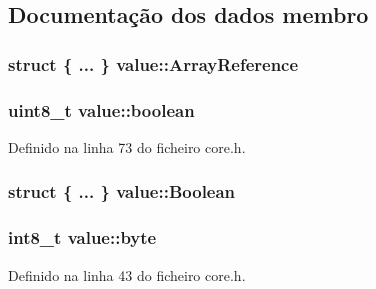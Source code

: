 \subsection{Documentação dos dados membro}
\hypertarget{structvalue_a09d361f523397d57aa1589c63fddb429}{
\subsubsection[{Array\-Reference}]{\setlength{\rightskip}{0pt plus 5cm}struct \{ ... \}   value\-::\-Array\-Reference}}\label{structvalue_a09d361f523397d57aa1589c63fddb429}
\hypertarget{structvalue_accc539dfc5234b1ff83f084dfeedab4e}{
\subsubsection[{boolean}]{\setlength{\rightskip}{0pt plus 5cm}uint8\-\_\-t value\-::boolean}}\label{structvalue_accc539dfc5234b1ff83f084dfeedab4e}


Definido na linha 73 do ficheiro core.\-h.

\hypertarget{structvalue_a3daafd6e88c6428a0be01e1a4002eb96}{
\subsubsection[{Boolean}]{\setlength{\rightskip}{0pt plus 5cm}struct \{ ... \}   value\-::\-Boolean}}\label{structvalue_a3daafd6e88c6428a0be01e1a4002eb96}
\hypertarget{structvalue_a5827febe7b21adba8ddb86bbf0996e8c}{
\subsubsection[{byte}]{\setlength{\rightskip}{0pt plus 5cm}int8\-\_\-t value\-::byte}}\label{structvalue_a5827febe7b21adba8ddb86bbf0996e8c}


Definido na linha 43 do ficheiro core.\-h.

